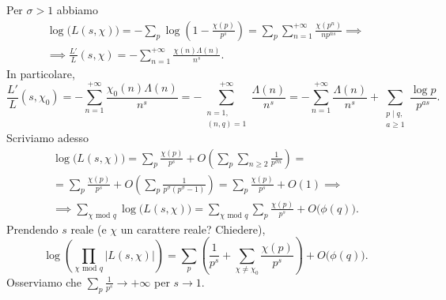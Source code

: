 \begin{oss}
  Per $\sigma>1$ abbiamo
  \begin{gather*}
    \log\big(L(s,\chi)\big)=-\sum_p \log\left(1-\frac{\chi(p)}{p^s}\right)=\sum_p\sum_{n=1}^{+\infty} \frac{\chi(p^n)}{np^{ns}} \implies \\
    \implies \frac{L'}{L}(s,\chi)=-\sum_{n=1}^{+\infty} \frac{\chi(n)\Lambda(n)}{n^s}.
  \end{gather*}
  In particolare,
  $$\frac{L'}{L}(s,\chi_0)=-\sum_{n=1}^{+\infty} \frac{\chi_0(n)\Lambda(n)}{n^s}=-\sum_{\substack{n=1, \\ (n,q)=1}}^{+\infty} \frac{\Lambda(n)}{n^s}=-\sum_{n=1}^{+\infty} \frac{\Lambda(n)}{n^s}+\sum_{\substack{p \mid q, \\a \ge 1}} \frac{\log{p}}{p^{as}}.$$
  Scriviamo adesso
  \begin{gather*}
    \log\big(L(s,\chi)\big)=\sum_p \frac{\chi(p)}{p^s}+O\left(\sum_p \sum_{n \ge 2} \frac{1}{p^{\sigma n}}\right)=\\
    =\sum_p \frac{\chi(p)}{p^s}+O\left(\sum_p \frac{1}{p^{\sigma}(p^{\sigma}-1)}\right)=\sum_p \frac{\chi(p)}{p^s}+O(1) \implies \\
    \implies \sum_{\chi\text{ mod }q}\log\big(L(s,\chi)\big)=\sum_{\chi\text{ mod }q}\sum_p \frac{\chi(p)}{p^s}+O\big(\phi(q)\big).
  \end{gather*}
  Prendendo $s$ reale (e $\chi$ un carattere reale? Chiedere),
  $$\log\left(\prod_{\chi\text{ mod }q}|L(s,\chi)|\right)=\sum_p\left(\frac{1}{p^s}+\sum_{\chi\not=\chi_0}\frac{\chi(p)}{p^s}\right)+O\big(\phi(q)\big).$$
  Osserviamo che $\displaystyle \sum_p\frac{1}{p^s} \longrightarrow +\infty$ per $s \longrightarrow 1$.
\end{oss}
